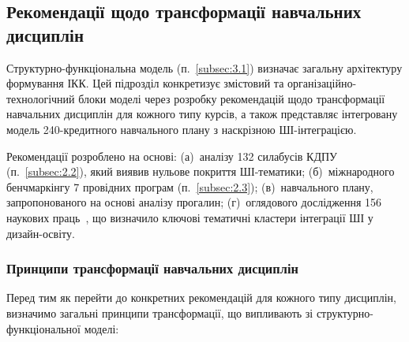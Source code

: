 \subsection{Рекомендації щодо трансформації навчальних дисциплін}\label{subsec:3.2}

Структурно-функціональна модель (п.~\ref{subsec:3.1}) визначає загальну архітектуру формування ІКК. Цей підрозділ конкретизує змістовий та організаційно-технологічний блоки моделі через розробку рекомендацій щодо трансформації навчальних дисциплін для кожного типу курсів, а також представляє інтегровану модель 240-кредитного навчального плану з наскрізною ШІ-інтеграцією.

Рекомендації розроблено на основі: (а)~аналізу 132 силабусів КДПУ (п.~\ref{subsec:2.2}), який виявив нульове покриття ШІ-тематики; (б)~міжнародного бенчмаркінгу 7 провідних програм (п.~\ref{subsec:2.3}); (в)~навчального плану, запропонованого на основі аналізу прогалин; (г)~оглядового дослідження 156 наукових праць~\cite{Musiienko2026ScopingReview}, що визначило ключові тематичні кластери інтеграції ШІ у дизайн-освіту.

\subsubsection{Принципи трансформації навчальних дисциплін}\label{sssec:3.2.1}

Перед тим як перейти до конкретних рекомендацій для кожного типу дисциплін, визначимо загальні принципи трансформації, що випливають зі структурно-функціональної моделі:

